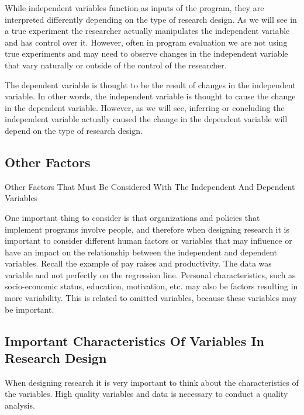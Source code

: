 \documentclass[]{book}
\theoremstyle{definition}
\theoremstyle{definition}
\theoremstyle{definition}
\theoremstyle{remark}
\begin{document}
While independent variables function as inputs of the program, they are
interpreted differently depending on the type of research design. As we
will see in a true experiment the researcher actually manipulates the
independent variable and has control over it. However, often in program
evaluation we are not using true experiments and may need to observe
changes in the independent variable that vary naturally or outside of
the control of the researcher.

The dependent variable is thought to be the result of changes in the
independent variable. In other words, the independent variable is
thought to cause the change in the dependent variable. However, as we
will see, inferring or concluding the independent variable actually
caused the change in the dependent variable will depend on the type of
research design.

\hypertarget{other-factors}{%
\subsection{Other Factors}\label{other-factors}}

Other Factors That Must Be Considered With The Independent And Dependent
Variables

One important thing to consider is that organizations and policies that
implement programs involve people, and therefore when designing research
it is important to consider different human factors or variables that
may influence or have an impact on the relationship between the
independent and dependent variables. Recall the example of pay raises
and productivity. The data was variable and not perfectly on the
regression line. Personal characteristics, such as socio-economic
status, education, motivation, etc. may also be factors resulting in
more variability. This is related to omitted variables, because these
variables may be important.

\hypertarget{important-characteristics-of-variables-in-research-design}{%
\subsection{Important Characteristics Of Variables In Research
Design}\label{important-characteristics-of-variables-in-research-design}}

When designing research it is very important to think about the
characteristics of the variables. High quality variables and data is
necessary to conduct a quality analysis.
\end{document}
